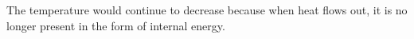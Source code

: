 The temperature would continue to decrease because when heat flows out, it is no longer present in the form of internal energy.
